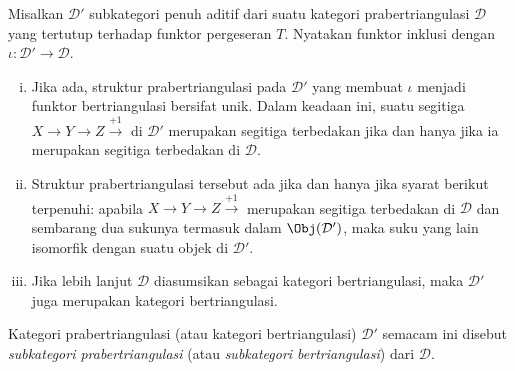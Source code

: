 \begin{definisiproposisi}\label{def:triangulated-subcat}
	Misalkan $\mathcal{D}'$ subkategori penuh aditif dari suatu kategori
	prabertriangulasi $\mathcal{D}$ yang tertutup terhadap funktor pergeseran
	$T$. Nyatakan funktor inklusi dengan
	$\iota: \mathcal{D}' \to \mathcal{D}$.
	\begin{enumerate}[(i)]
		\item Jika ada, struktur prabertriangulasi pada $\mathcal{D}'$ yang
		membuat $\iota$ menjadi funktor bertriangulasi bersifat unik. Dalam
		keadaan ini, suatu segitiga $X \to Y \to Z \xrightarrow{+1}$ di
		$\mathcal{D}'$ merupakan segitiga terbedakan jika dan hanya jika ia
		merupakan segitiga terbedakan di $\mathcal{D}$.
		\item Struktur prabertriangulasi tersebut ada jika dan hanya jika syarat
		berikut terpenuhi: apabila $X \to Y \to Z \xrightarrow{+1}$ merupakan
		segitiga terbedakan di $\mathcal{D}$ dan sembarang dua sukunya termasuk
		dalam $\Obj(\mathcal{D}')$, maka suku yang lain isomorfik dengan suatu
		objek di $\mathcal{D}'$.
		\item Jika lebih lanjut $\mathcal{D}$ diasumsikan sebagai kategori
		bertriangulasi, maka $\mathcal{D}'$ juga merupakan kategori
		bertriangulasi.
	\end{enumerate}

	Kategori prabertriangulasi (atau kategori bertriangulasi) $\mathcal{D}'$
	semacam ini disebut \emph{subkategori prabertriangulasi} (atau
	\emph{subkategori bertriangulasi}) dari $\mathcal{D}$.
\end{definisiproposisi}

